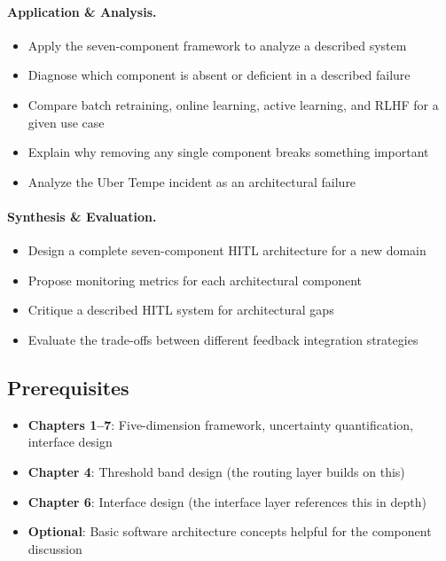 \paragraph{Application \& Analysis.}
\begin{itemize}
    \item Apply the seven-component framework to analyze a described system
    \item Diagnose which component is absent or deficient in a described failure
    \item Compare batch retraining, online learning, active learning, and RLHF for a given use case
    \item Explain why removing any single component breaks something important
    \item Analyze the Uber Tempe incident as an architectural failure
\end{itemize}

\paragraph{Synthesis \& Evaluation.}
\begin{itemize}
    \item Design a complete seven-component HITL architecture for a new domain
    \item Propose monitoring metrics for each architectural component
    \item Critique a described HITL system for architectural gaps
    \item Evaluate the trade-offs between different feedback integration strategies
\end{itemize}

\subsection{Prerequisites}
\begin{itemize}
    \item \textbf{Chapters 1--7}: Five-dimension framework, uncertainty quantification, interface design
    \item \textbf{Chapter 4}: Threshold band design (the routing layer builds on this)
    \item \textbf{Chapter 6}: Interface design (the interface layer references this in depth)
    \item \textbf{Optional}: Basic software architecture concepts helpful for the component discussion
\end{itemize}

